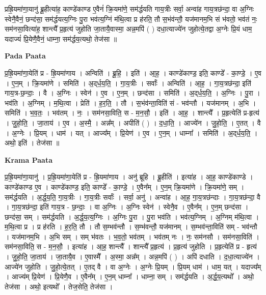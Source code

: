 \documentclass[17pt]{extarticle}
\begin{document}
प्रह्रि॒यमा॑णा॒यानु॑ ब्रू॒हीत्या॑ह॒ काण्डे॑काण्ड ए॒वैनं॑ क्रि॒यमा॑णे॒ सम॑र्द्धयति गाय॒त्रीः सर्वा॒ अन्वा॑ह गाय॒त्रछ॑न्दा॒ वा अ॒ग्निः स्वेनै॒वैनं॒ छन्द॑सा॒ सम॑र्द्धयत्य॒ग्निः पु॒रा भव॑त्य॒ग्निं म॑थि॒त्वा प्र ह॑रति॒ तौ स॒भंव॑न्तौ॒ यज॑मानम॒भि सं भ॑वतो॒ भव॑तं नः॒ सम॑नसा॒वित्या॑ह॒ शान्त्यै᳚ प्र॒हृत्य॑ जुहोति जा॒तायै॒वास्मा॒ अन्न॒मपि॑ ( ) दधा॒त्याज्ये॑न जुहोत्ये॒तद्वा अ॒ग्नेः प्रि॒यं धाम॒ यदाज्यं॑ प्रि॒येणै॒वैनं॒ धाम्ना॒ सम॑र्द्धय॒त्यथो॒ तेज॑सा ॥ \newline

\textbf{Pada Paata} \newline

प्र॒ह्रि॒यमा॑णा॒येति॑ प्र - ह्रि॒यमा॑णाय । अन्विति॑ । ब्रू॒हि॒ । इति॑ । आ॒ह॒ । काण्डे॑काण्ड॒ इति॒ काण्डे᳚ - का॒ण्डे॒ । ए॒व । ए॒न॒म् । क्रि॒यमा॑णे । समिति॑ । अ॒द्‌र्ध॒य॒ति॒ । गा॒य॒त्रीः । सर्वाः᳚ । अन्विति॑ । आ॒ह॒ । गा॒य॒त्रछ॑न्दा॒ इति॑ गाय॒त्र-छ॒न्दाः॒ । वै । अ॒ग्निः । स्वेन॑ । ए॒व । ए॒न॒म् । छन्द॑सा । समिति॑ । अ॒द्‌र्ध॒य॒ति॒ । अ॒ग्निः । पु॒रा । भव॑ति । अ॒ग्निम् । म॒थि॒त्वा । प्रेति॑ । ह॒र॒ति॒ । तौ । स॒भंव॑न्ता॒विति॑ सं - भव॑न्तौ । यज॑मानम् । अ॒भि । समिति॑ । भ॒व॒तः॒ । भव॑तम् । नः॒ । सम॑नसा॒विति॒ स - म॒न॒सौ॒ । इति॑ । आ॒ह॒ । शान्त्यै᳚ । प्र॒हृत्येति॑ प्र-हृत्य॑ । जु॒हो॒ति॒ । जा॒ताय॑ । ए॒व । अ॒स्मै॒ । अन्न᳚म् । अपीति॑ ( ) । द॒धा॒ति॒ । आज्ये॑न । जु॒हो॒ति॒ । ए॒तत् । वै । अ॒ग्नेः । प्रि॒यम् । धाम॑ । यत् । आज्य᳚म् । प्रि॒येण॑ । ए॒व । ए॒न॒म् । धाम्ना᳚ । समिति॑ । अ॒द्‌र्ध॒य॒ति॒ । अथो॒ इति॑ । तेज॑सा ॥  \newline


\textbf{Krama Paata} \newline

प्र॒ह्रि॒यमा॑णा॒यानु॑ । प्र॒ह्रि॒यमा॑णा॒येति॑ प्र - ह्रि॒यमा॑णाय । अनु॑ ब्रूहि । ब्रू॒हीति॑ । इत्या॑ह । आ॒ह॒ काण्डे॑काण्डे । काण्डे॑काण्ड ए॒व । काण्डे॑काण्ड॒ इति॒ काण्डे᳚ - का॒ण्डे॒ । ए॒वैन᳚म् । ए॒न॒म् क्रि॒यमा॑णे । क्रि॒यमा॑णे॒ सम् । सम॑र्द्धयति । अ॒र्द्ध॒य॒ति॒ गा॒य॒त्रीः । गा॒य॒त्रीः सर्वाः᳚ । सर्वा॒ अनु॑ । अन्वा॑ह । आ॒ह॒ गा॒य॒त्रछ॑न्दाः । गा॒य॒त्रछ॑न्दा॒ वै । गा॒य॒त्रछ॑न्दा॒ इति॑ गाय॒त्र - छ॒न्दाः॒ । वा अ॒ग्निः । अ॒ग्निः स्वेन॑ । स्वेनै॒व । ए॒वैन᳚म् । ए॒न॒म् छन्द॑सा । छन्द॑सा॒ सम् । सम॑र्द्धयति । अ॒र्द्ध॒य॒त्य॒ग्निः । अ॒ग्निः पु॒रा । पु॒रा भव॑ति । भव॑त्य॒ग्निम् । अ॒ग्निम् म॑थि॒त्वा । म॒थि॒त्वा प्र । प्र ह॑रति । ह॒र॒ति॒ तौ । तौ स॒म्भव॑न्तौ । स॒म्भ॑वन्तौ॒ यज॑मानम् । स॒म्भव॑न्ता॒विति॑ सम् - भव॑न्तौ । यज॑मानम॒भि । अ॒भि सम् । सम् भ॑वतः । भ॒व॒तो॒ भव॑तम् । भव॑तम् नः । नः॒ सम॑नसौ । सम॑नसा॒विति॑ । सम॑नसा॒विति॒ स - म॒न॒सौ॒ । इत्या॑ह । आ॒ह॒ शान्त्यै᳚ । शान्त्यै᳚ प्र॒हृत्य॑ । प्र॒हृत्य॑ जुहोति । प्र॒हृत्येति॑ प्र - हृत्य॑ । जु॒हो॒ति॒ जा॒ताय॑ । जा॒तायै॒व । ए॒वास्मै᳚ । अ॒स्मा॒ अन्न᳚म् । अन्न॒मपि॑ ( ) । अपि॑ दधाति । द॒धा॒त्याज्ये॑न । आज्ये॑न जुहोति । जु॒हो॒त्ये॒तत् । ए॒तद् वै । वा अ॒ग्नेः । अ॒ग्नेः प्रि॒यम् । प्रि॒यम् धाम॑ । धाम॒ यत् । यदाज्य᳚म् । आज्य॑म् प्रि॒येण॑ । प्रि॒येणै॒व । ए॒वैन᳚म् । ए॒न॒म् धाम्ना᳚ । धाम्ना॒ सम् । सम॑र्द्धयति । अ॒र्द्ध॒य॒त्यथो᳚ । अथो॒ तेज॑सा । अथो॒ इत्यथो᳚ । तेज॒सेति॒ तेज॑सा । \newline
\end{document}

